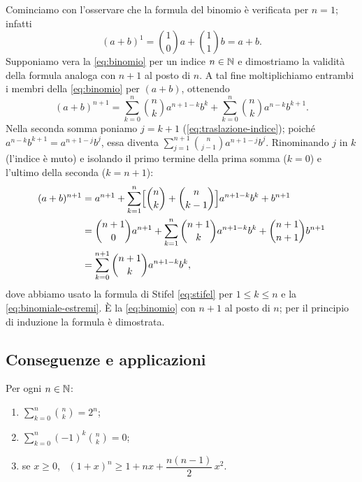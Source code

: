 \begin{dimostrazione}
Cominciamo con l'osservare che la formula del binomio è verificata per $n=1$; infatti
\begin{equation}\label{eq:binomio-base}
  (a+b)^{1}=\binom10a+\binom11b=a+b.
\end{equation}
Supponiamo vera la \eqref{eq:binomio} per un indice $n\in\mathbb{N}$ e dimostriamo la validità
della formula analoga con $n+1$ al posto di $n$. A tal fine moltiplichiamo entrambi i
membri della \eqref{eq:binomio} per $(a+b)$, ottenendo
\[
  (a+b)^{n+1}=\sum_{k=0}^{n}\binom nk a^{n+1-k}b^{k}+\sum_{k=0}^{n}\binom nk a^{n-k}b^{k+1}.
\]
Nella seconda somma poniamo $j=k+1$ (\eqref{eq:traslazione-indice}); poiché
$a^{n-k}b^{k+1}=a^{n+1-j}b^{j}$, essa diventa
$\sum_{j=1}^{n+1}\binom{n}{j-1}a^{n+1-j}b^{j}$. Rinominando $j$ in $k$ (l'indice è muto)
e isolando il primo termine della prima somma ($k=0$) e l'ultimo della seconda
($k=n+1$):
\begin{equation}\label{eq:binomio-passo}
\begin{split}
  (a+b)^{n+1}&=a^{n+1}+\sum_{k=1}^{n}\Bigl[\binom nk+\binom n{k-1}\Bigr]a^{n+1-k}b^{k}+b^{n+1}\\
  &=\binom{n+1}{0}a^{n+1}+\sum_{k=1}^{n}\binom{n+1}{k}a^{n+1-k}b^{k}+\binom{n+1}{n+1}b^{n+1}\\
  &=\sum_{k=0}^{n+1}\binom{n+1}{k}a^{n+1-k}b^{k},
\end{split}
\end{equation}
dove abbiamo usato la formula di Stifel \eqref{eq:stifel} per $1\le k\le n$ e la
\eqref{eq:binomiale-estremi}. È la \eqref{eq:binomio} con $n+1$ al posto di $n$; per il
principio di induzione la formula è dimostrata.
\end{dimostrazione}

\subsection{Conseguenze e applicazioni}

\begin{corollario}\label{cor:binomio}
Per ogni $n\in\mathbb{N}$:
\begin{enumerate}
  \item $\displaystyle\sum_{k=0}^{n}\binom nk=2^{n}$;
  \item $\displaystyle\sum_{k=0}^{n}(-1)^{k}\binom nk=0$;
  \item se $x\ge0$, \ $(1+x)^{n}\ge1+nx+\dfrac{n(n-1)}{2}\,x^{2}$.
\end{enumerate}
\end{corollario}

